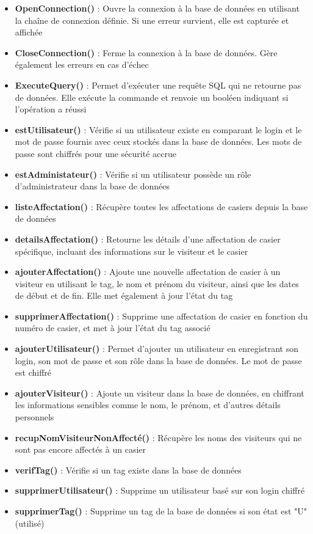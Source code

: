 \documentclass[main.tex]{subfiles}
\begin{document}
\begin{itemize}
\item \textbf{OpenConnection()} : Ouvre la connexion à la base de données en utilisant la chaîne de connexion définie. Si une erreur survient, elle est capturée et affichée
\item \textbf{CloseConnection()} : Ferme la connexion à la base de données. Gère également les erreurs en cas d'échec
\item \textbf{ExecuteQuery()} : Permet d'exécuter une requête SQL qui ne retourne pas de données. Elle exécute la commande et renvoie un booléen indiquant si l'opération a réussi
\item \textbf{estUtilisateur()} : Vérifie si un utilisateur existe en comparant le login et le mot de passe fournis avec ceux stockés dans la base de données. Les mots de passe sont chiffrés pour une sécurité accrue
\item \textbf{estAdministateur()} : Vérifie si un utilisateur possède un rôle d'administrateur dans la base de données
\item \textbf{listeAffectation()} : Récupère toutes les affectations de casiers depuis la base de données
\item \textbf{detailsAffectation()} : Retourne les détails d'une affectation de casier spécifique, incluant des informations sur le visiteur et le casier
\item \textbf{ajouterAffectation()} : Ajoute une nouvelle affectation de casier à un visiteur en utilisant le tag, le nom et prénom du visiteur, ainsi que les dates de début et de fin. Elle met également à jour l'état du tag
\item \textbf{supprimerAffectation()} : Supprime une affectation de casier en fonction du numéro de casier, et met à jour l'état du tag associé
\item \textbf{ajouterUtilisateur()} : Permet d'ajouter un utilisateur en enregistrant son login, son mot de passe et son rôle dans la base de données. Le mot de passe est chiffré
\item \textbf{ajouterVisiteur()} : Ajoute un visiteur dans la base de données, en chiffrant les informations sensibles comme le nom, le prénom, et d'autres détails personnels
\item \textbf{recupNomVisiteurNonAffecté()} : Récupère les noms des visiteurs qui ne sont pas encore affectés à un casier
\item \textbf{verifTag()} : Vérifie si un tag existe dans la base de données
\item \textbf{supprimerUtilisateur()} : Supprime un utilisateur basé sur son login chiffré
\item \textbf{supprimerTag()} : Supprime un tag de la base de données si son état est "U" (utilisé)
\end{itemize}
\end{document}
